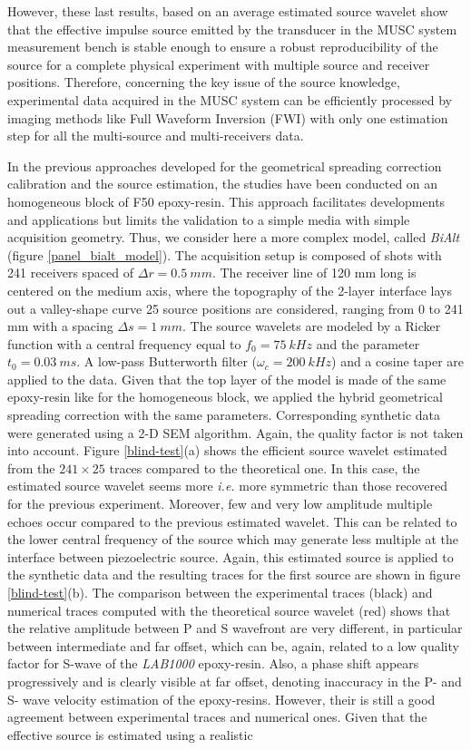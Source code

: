 \documentclass[manuscript,revised]{geophysics}
\newcommand{\twod}{2-D }
\newcommand{\bialt}{\textit{BiAlt} }
\begin{document}
\noindent However, these last results, based on an average estimated source wavelet show that the effective impulse source emitted by the transducer in the MUSC system measurement bench is stable enough to ensure a robust reproducibility of the source for a complete physical experiment with multiple source and receiver positions. Therefore, concerning the key issue of the source knowledge, experimental data acquired in the MUSC system can be efficiently processed by imaging methods like Full Waveform Inversion (FWI) with only one estimation step for all the multi-source and multi-receivers data.

\noindent In the previous approaches developed for the geometrical spreading correction calibration and the source estimation, the studies have been conducted on an homogeneous block of F50 epoxy-resin. This approach facilitates developments and applications but limits the validation to a simple media with simple acquisition geometry. Thus, we consider here a more complex model, called \bialt (figure \ref{panel_bialt_model}). The acquisition setup is composed of shots with 241 receivers spaced of $\Delta r=0.5\ mm$. The receiver line of 120 mm long is centered on the medium axis, where the topography of the 2-layer interface lays out a valley-shape curve 25 source positions are considered, ranging from 0 to 241 mm with a spacing $\Delta s=1\ mm$. The source wavelets are modeled by a Ricker function with a central frequency equal to $f_{0}=75\ kHz$ and the parameter $t_{0}=0.03\ ms$. A low-pass Butterworth filter ($\omega_{c}=200\ kHz$) and a cosine taper are applied to the data. Given that the top layer of the model is made of the same epoxy-resin like for the homogeneous block, we applied the hybrid geometrical spreading correction with the same parameters. Corresponding synthetic data were generated using a \twod  SEM algorithm. Again, the quality factor is not taken into account. Figure \ref{blind-test}(a) shows the efficient source wavelet estimated from the $241 \times 25$ traces compared to the theoretical one. In this case, the estimated source wavelet seems more \textit{i.e.} more symmetric than those recovered for the previous experiment. Moreover, few and very low amplitude multiple echoes occur compared to the previous estimated wavelet. This can be related to the lower central frequency of the source which may generate less multiple at the interface between piezoelectric source. Again, this estimated source is applied to the synthetic data and the resulting traces  for the first source are shown in figure \ref{blind-test}(b). The comparison between the experimental traces (black) and numerical traces computed with the theoretical source wavelet (red) shows that the relative amplitude between P and S wavefront are very different, in particular between intermediate and far offset, which can be, again, related to a low quality factor for S-wave of the \textit{LAB1000} epoxy-resin. Also, a phase shift appears progressively and is clearly visible at far offset, denoting inaccuracy in the P- and S- wave velocity estimation of the epoxy-resins. However, their is still a good agreement between experimental traces and numerical ones. Given that the effective source is estimated using a realistic 
\end{document}
